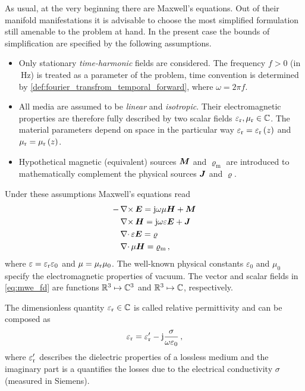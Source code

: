 As usual, at the very beginning there are Maxwell's equations.
Out of their manifold manifestations it is advisable to choose the most
simplified formulation still amenable to the problem at hand.
In the present case the bounds of simplification are specified by the following
assumptions.
\begin{itemize}
	\item Only stationary \emph{time-harmonic} fields are considered.
	The frequency $f > 0$ (in $\SI{}{\hertz}$) is treated as a parameter of the
	problem, time convention is determined by
	\cref{def:fourier_transfrom_temporal_forward}, where $\omega = 2\pi f$.
	\item All media are assumed to be \emph{linear} and \emph{isotropic}.
	Their electromagnetic properties are therefore fully described by two scalar
	fields $\varepsilon_{\mathrm{r}}, \mu_{\mathrm{r}} \in \mathbb{C}$.
	The material parameters depend on space in the particular way
	$\varepsilon_{\mathrm{r}} = \varepsilon_{\mathrm{r}}\left(z\right)$ and $\mu_{\mathrm{r}} = \mu_{\mathrm{r}}\left(z\right)$.
	\item Hypothetical magnetic (equivalent) sources $\pvec{M}$ and
	$\varrho_\mathrm{m}$ are introduced to mathematically complement the
	physical sources $\pvec{J}$ and $\varrho$.
\end{itemize}
Under these assumptions Maxwell's equations read \cite{Harrington2001,Chew1999}
\begin{subequations}\label{eq:mwe_fd}
	\begin{align}
		-&\curl \pvec{E}
		= \im\omega\mu\pvec{H} + \pvec{M} \label{eq:mwe_fd_faraday} \\
		&\curl \pvec{H}
		= \im\omega\varepsilon\pvec{E} + \pvec{J} \label{eq:mwe_fd_ampere} \\
		&\divergence \varepsilon\pvec{E}
		= \varrho \label{eq:mwe_fd_gauss} \\
		&\divergence \mu\pvec{H}
		= \varrho_\mathrm{m} \,, \label{eq:mwe_fd_gauss_magnetic}
	\end{align}
\end{subequations}
where $\varepsilon = \varepsilon_{\mathrm{r}} \varepsilon_0$ and $\mu = \mu_{\mathrm{r}} \mu_0$.
The well-known physical constants $\varepsilon_0$ and $\mu_0$ specify the
electromagnetic properties of vacuum.
The vector and scalar fields in \eqref{eq:mwe_fd} are functions
$\mathbb{R}^3 \mapsto \mathbb{C}^3$ and $\mathbb{R}^3 \mapsto \mathbb{C}$, respectively.

The dimensionless quantity $\varepsilon_{\mathrm{r}} \in \mathbb{C}$ is called relative permittivity 
and can be composed as \cite[43]{Jin2015}
\begin{equation}
	\varepsilon_{\mathrm{r}} = \varepsilon_{\mathrm{r}}^\prime - \mathrm{j} \frac{\sigma}{\omega \varepsilon_0} \,,
\end{equation}
where $\varepsilon_{\mathrm{r}}^\prime$ describes the dielectric properties of a lossless medium
and the imaginary part is a quantifies the losses due to the electrical
conductivity $\sigma$ (measured in Siemens).

